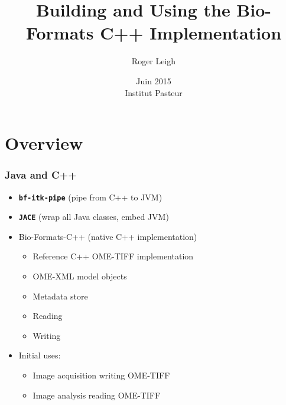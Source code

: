 \documentclass{beamer}
\title{Building and Using the Bio-Formats C++ Implementation}
\author{Roger Leigh}
\date{Juin 2015\\Institut Pasteur}
\newcommand{\cmd}[1]{\textbf{\texttt{#1}}}
\begin{document}
\begin{frame}[plain]
  \titlepage
  \begin{center}
     \hfill
    \hfill
  \end{center}
\end{frame}

\section[]{Overview}

\begin{frame}
  \frametitle{Java and C++}
  \begin{itemize}
  \item \cmd{bf-itk-pipe} (pipe from C++ to JVM)
  \item \cmd{JACE} (wrap all Java classes, embed JVM)
  \item Bio-Formats-C++ (native C++ implementation)
    \pause
    \begin{itemize}
    \item Reference C++ OME-TIFF implementation
    \item OME-XML model objects
    \item Metadata store
    \item Reading
    \item Writing
    \end{itemize}
    \pause
  \item Initial uses:
    \begin{itemize}
    \item Image acquisition writing OME-TIFF
    \item Image analysis reading OME-TIFF
    \end{itemize}
  \end{itemize}
\end{frame}
\end{document}
